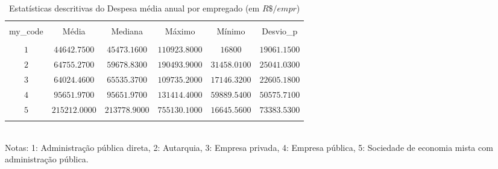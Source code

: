 

\begin{table}[H] \centering 
	\begin{minipage}{0.9\textwidth}
  \caption{Estatísticas descritivas do Despesa média anual por empregado (em $R\$/empr$)} 
  \label{tab:in008} 
\begin{tabular}{@{\extracolsep{5pt}} cccccc} 
\\[-1.8ex]\hline 
\hline \\[-1.8ex] 
my\_code & Média & Mediana & Máximo & Mínimo & Desvio\_p \\ 
\hline \\[-1.8ex] 
$1$ & $44642.7500$ & $45473.1600$ & $110923.8000$ & $16800$ & $19061.1500$ \\ 
$2$ & $64755.2700$ & $59678.8300$ & $190493.9000$ & $31458.0100$ & $25041.0300$ \\ 
$3$ & $64024.4600$ & $65535.3700$ & $109735.2000$ & $17146.3200$ & $22605.1800$ \\ 
$4$ & $95651.9700$ & $95651.9700$ & $131414.4000$ & $59889.5400$ & $50575.7100$ \\ 
$5$ & $215212.0000$ & $213778.9000$ & $755130.1000$ & $16645.5600$ & $73383.5300$ \\ 
\hline \\[-1.8ex] 
\end{tabular} 
	\footnotesize \\
		Notas: 1: Administração pública direta, 2: Autarquia, 3: Empresa privada, 4: Empresa pública, 5: Sociedade de economia mista com administração pública.
	\end{minipage}
\end{table} 
